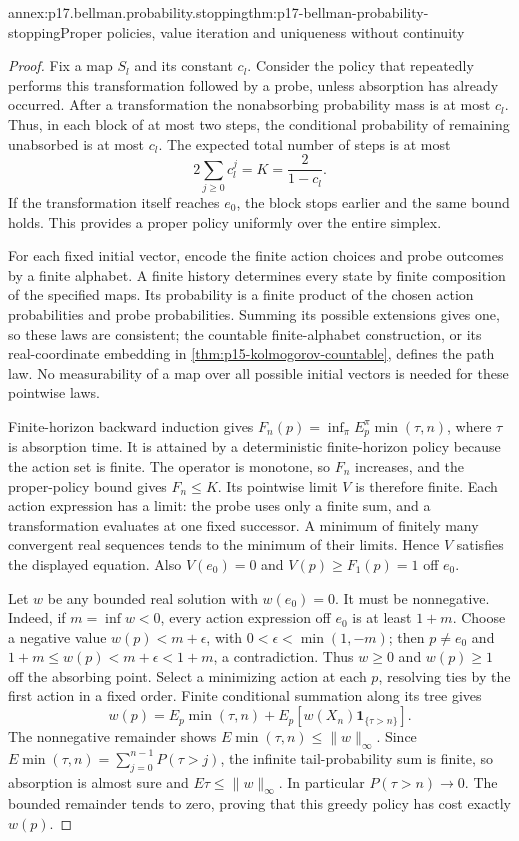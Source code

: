 \begin{annexitem}{annex:p17.bellman.probability.stopping}{thm:p17-bellman-probability-stopping}{Proper policies, value iteration and uniqueness without continuity}
\begin{proof}
Fix a map \(S_l\) and its constant \(c_l\).
Consider the policy that repeatedly performs
this transformation followed by a probe,
unless absorption has already occurred.
After a transformation the nonabsorbing
probability mass is at most \(c_l\).
Thus, in each block of at most two steps,
the conditional probability of remaining
unabsorbed is at most \(c_l\).
The expected total number of steps is at
most
\[
                        2\sum_{j\geq0}c_l^j
                                      =K=\frac2{1-c_l}.
\]
If the transformation itself reaches \(e_0\),
the block stops earlier and the same bound
holds. This provides a proper policy
uniformly over the entire simplex.

For each fixed initial vector, encode the
finite action choices and probe outcomes
by a finite alphabet. A finite history
determines every state by finite composition
of the specified maps. Its probability
is a finite product of the chosen action
probabilities and probe probabilities.
Summing its possible extensions gives one,
so these laws are consistent; the countable
finite-alphabet construction, or its
real-coordinate embedding in
\cref{thm:p15-kolmogorov-countable}, defines
the path law. No measurability of a map
over all possible initial vectors is
needed for these pointwise laws.

Finite-horizon backward induction gives
\(F_n(p)=\inf_\pi E_p^\pi\min(\tau,n)\),
where \(\tau\) is absorption time.
It is attained by a deterministic
finite-horizon policy because the
action set is finite. The operator
is monotone, so \(F_n\) increases,
and the proper-policy bound gives
\(F_n\leq K\). Its pointwise limit
\(V\) is therefore finite.
Each action expression has a limit:
the probe uses only a finite sum,
and a transformation evaluates at
one fixed successor. A minimum of
finitely many convergent real
sequences tends to the minimum
of their limits. Hence \(V\)
satisfies the displayed equation.
Also \(V(e_0)=0\) and
\(V(p)\geq F_1(p)=1\) off \(e_0\).

Let \(w\) be any bounded real
solution with \(w(e_0)=0\).
It must be nonnegative. Indeed, if
\(m=\inf w<0\), every action
expression off \(e_0\) is at
least \(1+m\). Choose a negative
value \(w(p)<m+\epsilon\), with
\(0<\epsilon<\min(1,-m)\);
then \(p\ne e_0\) and
\(1+m\leq w(p)<m+\epsilon<1+m\),
a contradiction.
Thus \(w\geq0\) and \(w(p)\geq1\)
off the absorbing point.
Select a minimizing action at
each \(p\), resolving ties by
the first action in a fixed order.
Finite conditional summation
along its tree gives
\[
 w(p)=E_p\min(\tau,n)
                  +E_p[w(X_n)\mathbf1_{\{\tau>n\}}].
\]
The nonnegative remainder shows
\(E\min(\tau,n)\leq\|w\|_\infty\).
Since
\(E\min(\tau,n)=\sum_{j=0}^{n-1}P(\tau>j)\),
the infinite tail-probability sum
is finite, so absorption is almost
sure and \(E\tau\leq\|w\|_\infty\).
In particular \(P(\tau>n)\to0\).
The bounded remainder tends to
zero, proving that this greedy
policy has cost exactly \(w(p)\).


\end{proof}
\end{annexitem}
